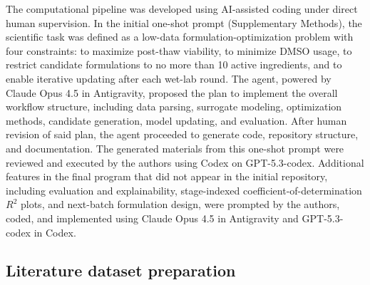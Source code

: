 \documentclass[11pt]{article}
\begin{document}
The computational pipeline was developed using AI-assisted coding under direct human supervision. In the initial one-shot prompt (Supplementary Methods), the scientific task was defined as a low-data formulation-optimization problem with four constraints: to maximize post-thaw viability, to minimize DMSO usage, to restrict candidate formulations to no more than 10 active ingredients, and to enable iterative updating after each wet-lab round. The agent, powered by Claude Opus 4.5 in Antigravity, proposed the plan to implement the overall workflow structure, including data parsing, surrogate modeling, optimization methods, candidate generation, model updating, and evaluation. After human revision of said plan, the agent proceeded to generate code, repository structure, and documentation. The generated materials from this one-shot prompt were reviewed and executed by the authors using Codex on GPT-5.3-codex. Additional features in the final program that did not appear in the initial repository, including evaluation and explainability, stage-indexed coefficient-of-determination $R^2$ plots, and next-batch formulation design, were prompted by the authors, coded, and implemented using Claude Opus 4.5 in Antigravity and GPT-5.3-codex in Codex.

\subsection{Literature dataset preparation}
\end{document}
